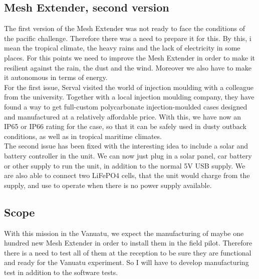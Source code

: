 \subsection{Mesh Extender, second version}
The first version of the Mesh Extender was not ready to face the conditions of the pacific challenge. Therefore there was a need to prepare it for this. By this, i mean the tropical climate, the heavy rains and the lack of electricity in some places. For this points we need to improve the Mesh Extender in order to make it resilient against the rain, the dust and the wind. Moreover we also have to make it autonomous in terms of energy. \\
For the first issue, Serval visited the world of injection moulding with a colleague from the university. Together with a local injection moulding company, they have found a way to get full-custom polycarbonate injection-moulded cases designed and manufactured at a relatively affordable price. With this, we have now an IP65 or IP66 rating for the case, so that it can be safely used in dusty outback conditions, as well as in tropical maritime climates.\\
The second issue has been fixed with the interesting idea to include a solar and battery controller in the unit. We can now just plug in a solar panel, car battery or other supply to run the unit, in addition to the normal 5V USB supply.  We are also able to connect two LiFePO4 cells, that the unit would charge from the supply, and use to operate when there is no power supply available. 

\subsection{Scope}
With this mission in the Vanuatu, we expect the manufacturing of maybe one hundred new Mesh Extender in order to install them in the field pilot. Therefore there is a need to test all of them at the reception to be sure they are functional and ready for the Vanuatu experiment. So I will have to develop manufacturing test in addition to the software tests.